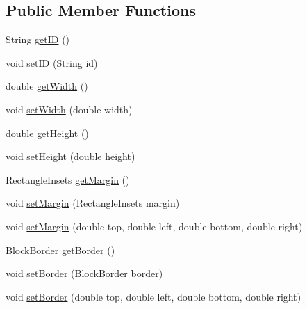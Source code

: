 \subsection*{Public Member Functions}
\begin{DoxyCompactItemize}
\item 
String \mbox{\hyperlink{classorg_1_1jfree_1_1chart_1_1block_1_1_abstract_block_a81378f2ce87b2bab348e8cab684cf6d1}{get\+ID}} ()
\item 
void \mbox{\hyperlink{classorg_1_1jfree_1_1chart_1_1block_1_1_abstract_block_a26268ae74a9bb05e1af266f8da1e849a}{set\+ID}} (String id)
\item 
double \mbox{\hyperlink{classorg_1_1jfree_1_1chart_1_1block_1_1_abstract_block_a0279de7c0fa1a68e5dec365d5fabaea6}{get\+Width}} ()
\item 
void \mbox{\hyperlink{classorg_1_1jfree_1_1chart_1_1block_1_1_abstract_block_a67ffb16ede962e6f032d7914bcc528ba}{set\+Width}} (double width)
\item 
double \mbox{\hyperlink{classorg_1_1jfree_1_1chart_1_1block_1_1_abstract_block_a29c5a029ad8b86eca5f234b61ab307be}{get\+Height}} ()
\item 
void \mbox{\hyperlink{classorg_1_1jfree_1_1chart_1_1block_1_1_abstract_block_a093cf8477abdac969254656d9ef3d36d}{set\+Height}} (double height)
\item 
Rectangle\+Insets \mbox{\hyperlink{classorg_1_1jfree_1_1chart_1_1block_1_1_abstract_block_a31c97bb88e5c0e55a444f8b93e9c0ca8}{get\+Margin}} ()
\item 
void \mbox{\hyperlink{classorg_1_1jfree_1_1chart_1_1block_1_1_abstract_block_abbb2d7a0c7ccb9cd38d62aa00654903d}{set\+Margin}} (Rectangle\+Insets margin)
\item 
void \mbox{\hyperlink{classorg_1_1jfree_1_1chart_1_1block_1_1_abstract_block_abe33f2d97cfea5605a8b1a8fd9b88c5d}{set\+Margin}} (double top, double left, double bottom, double right)
\item 
\mbox{\hyperlink{classorg_1_1jfree_1_1chart_1_1block_1_1_block_border}{Block\+Border}} \mbox{\hyperlink{classorg_1_1jfree_1_1chart_1_1block_1_1_abstract_block_abd1516eaf2d394f5df681a58f86f069c}{get\+Border}} ()
\item 
void \mbox{\hyperlink{classorg_1_1jfree_1_1chart_1_1block_1_1_abstract_block_a859d9c229b154b88978a962e9fd18bb5}{set\+Border}} (\mbox{\hyperlink{classorg_1_1jfree_1_1chart_1_1block_1_1_block_border}{Block\+Border}} border)
\item 
void \mbox{\hyperlink{classorg_1_1jfree_1_1chart_1_1block_1_1_abstract_block_a95447db707d0f1b2571c743f8eb63f65}{set\+Border}} (double top, double left, double bottom, double right)

\end{DoxyCompactItemize}
